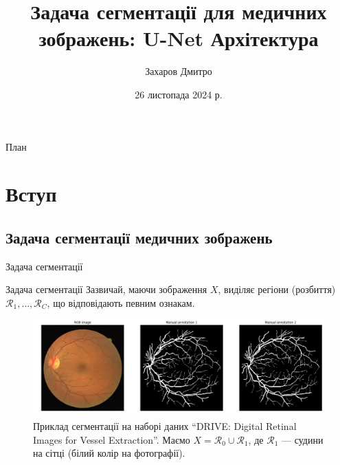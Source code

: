 \documentclass{zkdl-presentation-template}
\title{\textbf{Задача сегментації для медичних зображень: U-Net Архітектура}}
\author{Захаров Дмитро}
\date{26 листопада 2024 р.}
\begin{document}
	\frame {
		\titlepage
	}
 
	\begin{frame}{План}
        \tableofcontents
    \end{frame}
	 
	\section{Вступ}
    \subsection{Задача сегментації медичних зображень}
	\begin{frame}{Задача сегментації}	
		\begin{block}{Задача сегментації}
            Зазвичай, маючи зображення $X$, виділяє регіони (розбиття) $\mathcal{R}_1,\dots,\mathcal{R}_C$, що відповідають певним ознакам.
        \end{block}
        
        \begin{figure}
            \centering
            \includegraphics[width=\textwidth]{images/retinal-images.png}
            \caption{Приклад сегментації на наборі даних ``DRIVE: Digital Retinal Images for Vessel Extraction''. Маємо $X=\mathcal{R}_0 \cup \mathcal{R}_1$, де $\mathcal{R}_1$ --- судини на сітці (білий колір на фотографії).}
        \end{figure}
	\end{frame}
\end{document}
